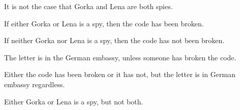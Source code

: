 \problempart
\label{pr.spies}
\begin{earg}
\item It is not the case that Gorka and Lena are both spies.
\item[] \smallskip

\item If either Gorka or Lena is a spy, then the code has been broken.
\item[] \smallskip

\item If neither Gorka nor Lena is a spy, then the code has not been broken.
\item[] \smallskip

\item The letter is in the German embassy, unless someone has broken the code.
\item[] \smallskip

\noindent\begin{minipage}{0.88\textwidth}
\item Either the code has been broken or it has not, but the letter is in German embassy regardless.
\item[] \medskip
\end{minipage}

\item Either Gorka or Lena is a spy, but not both.
\item[] 
\end{earg}

